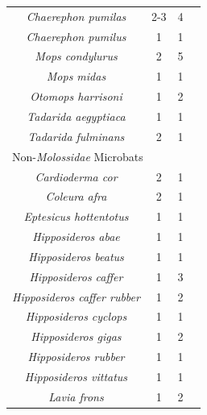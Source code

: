 \documentclass[9pt,twoside,lineno]{pnas-new}
\begin{document}
\begin{longtable}{cccp{5cm}}
\hline \hline
\textit{Chaerephon pumilas} & 2-3 & 4 & \cite{vanderMerwe1987AdaptiveS,Happold1989ReproductionAfrica.,MUTERE1973ReproductionMolossidae,Mcwilliam1987TheEnvironment}\\
\textit{Chaerephon pumilus} & 1 & 1 & \cite{Monadjem1998NotesRecords}\\
\textit{Mops condylurus} & 2 & 5 & \cite{Vivier1997Africa,Happold1989ReproductionAfrica.,OShea1980EcologicalCommunity,MUTERE1973ReproductionMolossidae}\\
\textit{Mops midas} & 1 & 1 & \cite{Smithers1971TheBotswana}\\
\textit{Otomops harrisoni} & 1 & 2 & \cite{MUTERE1973ReproductionMolossidae}\\
\textit{Tadarida aegyptiaca} & 1 & 1 & \cite{Bernard1995SeasonallyTemperate...}\\
\textit{Tadarida fulminans} & 2 & 1 & \cite{Cotterill1993SeasonallyZimbabwe}\\
\hline
\multicolumn{4}{l}{Non-\textit{Molossidae} Microbats} \\
\hline \hline
\textit{Cardioderma cor} & 2 & 1 & \cite{Vaughan1976NocturnalCor}\\
\textit{Coleura afra} & 2 & 1 & \cite{Mcwilliam1987TheEnvironment}\\
\textit{Eptesicus hottentotus} & 1 & 1 & \cite{Happold2013MammalsBats}\\
\textit{Hipposideros abae} & 1 & 1 & \cite{Verschuren1957EcologieChiropteres}\\
\textit{Hipposideros beatus} & 1 & 1 & \cite{Brosset1966LaChiropteres}\\
\textit{Hipposideros caffer} & 1 & 3 & \cite{Bernard1982FemaleAfrica,Ansell1986SomeAfrica,Menzies1973ANigeria}\\
\textit{Hipposideros caffer rubber} & 1 & 2 & \cite{Verschuren1957EcologieChiropteres,Wolton1982EcologicalMicrochiroptera}\\
\textit{Hipposideros cyclops
} & 1 & 1 & \cite{Verschuren1957EcologieChiropteres}\\
\textit{Hipposideros gigas} & 1 & 2 & \cite{Mcwilliam1982AdaptiveKenya,Brosset1969LaGabon}\\
\textit{Hipposideros rubber} & 1 & 1 & \cite{Howell1976AnTanzania}\\
\textit{Hipposideros vittatus} & 1 & 1 & \cite{Cotterill1999ReproductiveConservation}\\
\textit{Lavia frons} & 1 & 2 & \cite{Verschuren1957EcologieChiropteres,Vaughan1986SeasonalityYellow-Winged}\\

\end{longtable}
\end{document}
